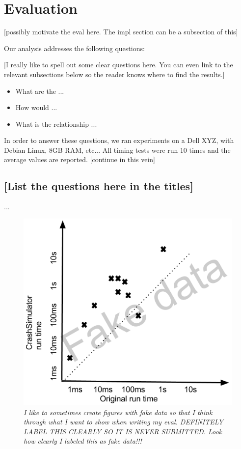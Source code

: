 \section{Evaluation}
\label{SEC:evaluation}

[possibly motivate the eval here.  The impl section can be a subsection of 
this]

Our analysis addresses the following questions:

[I really like to spell out some clear questions here.  You can even link
to the relevant subsections below so the reader knows where to find the 
results.]

\begin{itemize}

    \item What are the ...

    \item How would ...

    \item What is the relationship ...

\end{itemize}

In order to answer these questions, we ran experiments on a Dell XYZ, with
Debian Linux, 8GB RAM, etc...   All timing tests were run 10 times and the
average values are reported.  [continue in this vein]

\subsection{[List the questions here in the titles]}

...

\begin{figure}[t]
  \center{}
  \includegraphics[scale=.5]{images/FakeTimeEval}
  \caption{\emph{I like to sometimes create figures with fake data so that I 
think through what I want to show when writing my eval.  DEFINITELY LABEL THIS
CLEARLY SO IT IS NEVER SUBMITTED.  Look how clearly I labeled this as fake 
data!!!}
  \label{fig-time-eval} }
\end{figure}
